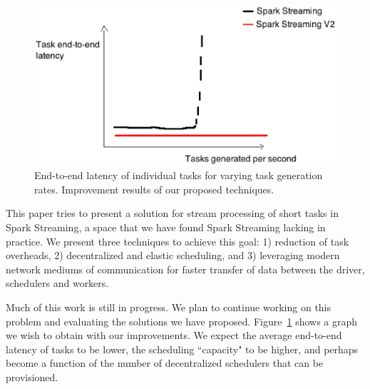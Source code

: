 \noindent

\begin{figure}[t!]
  \begin{center}
\includegraphics[scale=0.4]{money_graph.eps}
  \end{center}
  \caption{End-to-end latency of individual tasks for varying task generation rates. Improvement results of our proposed techniques.}
  \label{fig:money_graph}
\end{figure}

This paper tries to present a solution for stream processing of short tasks in Spark Streaming, a space that we have found Spark Streaming lacking in practice.
We present three techniques to achieve this goal: 1) reduction of task overheads, 2) decentralized and elastic scheduling, and 3) leveraging modern network mediums of communication for faster transfer of data between the driver, schedulers and workers.

Much of this work is still in progress. We plan to continue working on this problem and evaluating the solutions we have proposed. Figure~\ref{fig:money_graph} shows a graph we wish to obtain with our improvements. We expect the average end-to-end latency of tasks to be lower, the scheduling ``capacity" to be higher, and perhaps become a function of the number of decentralized schedulers that can be provisioned.
